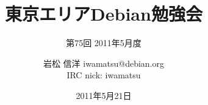




\documentclass[cjk,dvipdfmx,12pt]{beamer}
\usepackage{monthlypresentation}



\title{東京エリアDebian勉強会}
\subtitle{第75回 2011年5月度}
\author{岩松 信洋 iwamatsu@debian.org\\IRC nick: iwamatsu}
\date{2011年5月21日}



